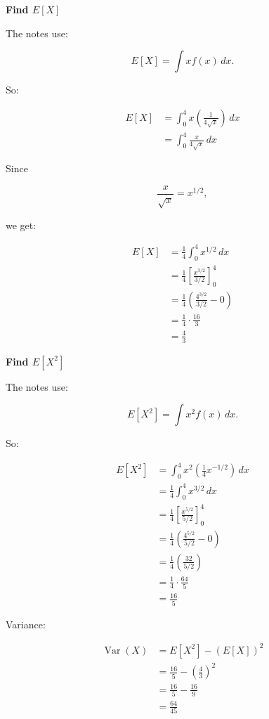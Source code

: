 \documentclass[10pt]{article}
\begin{document}
\textbf{Find $E[X]$}

The notes use:

\[
E[X]=\int x f(x)\,dx.
\]

So:

\begin{align*}
E[X]
&=
\int_0^4
x\left(\frac{1}{4\sqrt{x}}\right)\,dx \\[2mm]
&=
\int_0^4
\frac{x}{4\sqrt{x}}\,dx
\end{align*}

Since

\[
\frac{x}{\sqrt{x}}=x^{1/2},
\]

we get:

\begin{align*}
E[X]
&=
\frac{1}{4}
\int_0^4 x^{1/2}\,dx \\[2mm]
&=
\frac{1}{4}
\left[
\frac{x^{3/2}}{3/2}
\right]_0^4 \\[2mm]
&=
\frac{1}{4}
\left(
\frac{4^{3/2}}{3/2}-0
\right) \\[2mm]
&=
\frac{1}{4}\cdot \frac{16}{3} \\[2mm]
&=
\frac{4}{3}
\end{align*}

\textbf{Find $E[X^2]$}

The notes use:

\[
E[X^2]
=
\int x^2 f(x)\,dx.
\]

So:

\begin{align*}
E[X^2]
&=
\int_0^4
x^2\left(\frac{1}{4}x^{-1/2}\right)\,dx \\[2mm]
&=
\frac{1}{4}
\int_0^4
x^{3/2}\,dx \\[2mm]
&=
\frac{1}{4}
\left[
\frac{x^{5/2}}{5/2}
\right]_0^4 \\[2mm]
&=
\frac{1}{4}
\left(
\frac{4^{5/2}}{5/2}
-0
\right) \\[2mm]
&=
\frac{1}{4}
\left(
\frac{32}{5/2}
\right) \\[2mm]
&=
\frac{1}{4}\cdot \frac{64}{5} \\[2mm]
&=
\frac{16}{5}
\end{align*}

Variance:

\begin{align*}
\operatorname{Var}(X)
&=
E[X^2]-(E[X])^2 \\[2mm]
&=
\frac{16}{5}
-\left(\frac{4}{3}\right)^2 \\[2mm]
&=
\frac{16}{5}
-\frac{16}{9} \\[2mm]
&=
\frac{64}{45}
\end{align*}
\end{document}
